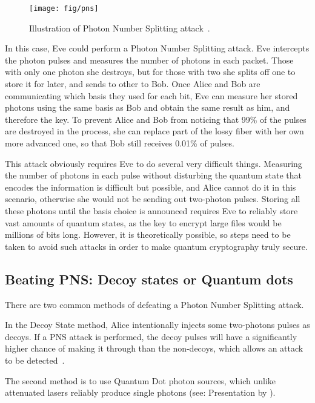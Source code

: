 \documentclass[12pt]{article}
\begin{document}
\begin{figure}[h]
	\centering
	\texttt{[image: fig/pns]}
	\caption{Illustration of Photon Number Splitting attack~\citep{pns}.}
	\label{fig:pns}
\end{figure}

In this case, Eve could perform a Photon Number Splitting attack.
Eve intercepts the photon pulses and measures the number of photons in each packet.
Those with only one photon she destroys, but for those with two she splits off one to store it for later, and sends to other to Bob.
Once Alice and Bob are communicating which basis they used for each bit, Eve can measure her stored photons using the same basis as Bob and obtain the same result as him, and therefore the key.
To prevent Alice and Bob from noticing that 99\% of the pulses are destroyed in the process, she can replace part of the lossy fiber with her own more advanced one, so that Bob still receives 0.01\% of pulses.

This attack obviously requires Eve to do several very difficult things.
Measuring the number of photons in each pulse without disturbing the quantum state that encodes the information is difficult but possible, and Alice cannot do it in this scenario, otherwise she would not be sending out two-photon pulses.
Storing all these photons until the basis choice is announced requires Eve to reliably store vast amounts of quantum states, as the key to encrypt large files would be millions of bits long.
However, it is theoretically possible, so steps need to be taken to avoid such attacks in order to make quantum cryptography truly secure.

\subsection{Beating PNS: Decoy states or Quantum dots}

There are two common methods of defeating a Photon Number Splitting attack.

In the Decoy State method, Alice intentionally injects some two-photons pulses as decoys.
If a PNS attack is performed, the decoy pulses will have a significantly higher chance of making it through than the non-decoys, which allows an attack to be detected~\citep{Bozzio_2022}.

The second method is to use Quantum Dot photon sources, which unlike attenuated lasers reliably produce single photons (see: Presentation by \citet{quantumdot}).
\end{document}
